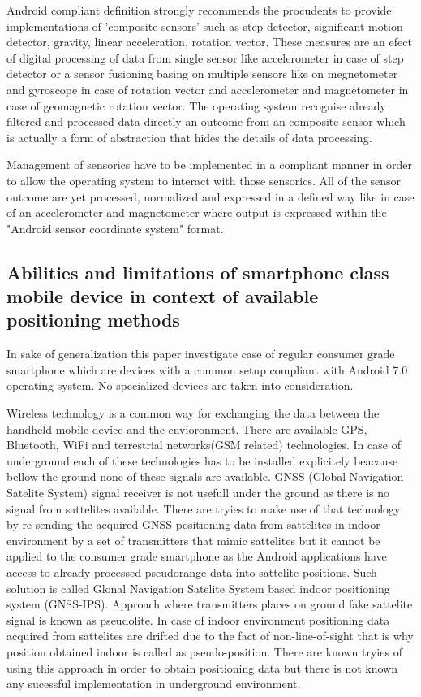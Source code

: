 \documentclass[../main.tex]{subfiles}
\begin{document}
Android compliant definition strongly recommends the procudents to provide implementations of 'composite sensors' such as step detector, significant motion detector, gravity, linear acceleration, rotation vector. These measures are an efect of digital processing of data from single sensor like accelerometer in case of step detector or a sensor fusioning basing on multiple sensors like on megnetometer and gyroscope in case of rotation vector and accelerometer and magnetometer in case of geomagnetic rotation vector. The operating system recognise already filtered and processed data directly an outcome from an composite sensor which is actually a form of abstraction that hides the details of data processing.

Management of sensorics have to be implemented in a compliant manner in order to allow the operating system to interact with those sensorics. All of the sensor outcome are yet processed, normalized and expressed in a defined way like in case of an accelerometer and magnetometer where output is expressed within the "Android sensor coordinate system" format.


\subsection{Abilities and limitations of smartphone class mobile device in context of available positioning methods}
\label{subs:smartphone_abilities_and_limitations}

In sake of generalization this paper investigate case of regular consumer grade smartphone which are devices with a common setup compliant with Android 7.0 operating system. No specialized devices are taken into consideration.

Wireless technology is a common way for exchanging the data between the handheld mobile device and the envioronment. There are available GPS, Bluetooth, WiFi and terrestrial networks(GSM related) technologies. In case of underground each of these technologies has to be installed explicitely beacause bellow the ground none of these signals are available. GNSS (Global Navigation Satelite System) signal receiver is not usefull under the ground as there is no signal from sattelites available. There are tryies to make use of that technology by re-sending the acquired GNSS positioning data from sattelites in indoor environment by a set of transmitters that mimic sattelites \cite{GPS_retransmission} but it cannot be applied to the consumer grade smartphone as the Android applications have access to already processed pseudorange data into sattelite positions. Such solution is called Glonal Navigation Satelite System based indoor positioning system (GNSS-IPS)\cite{GPS_retransmission_differential}. Approach where transmitters places on ground fake sattelite signal is known as pseudolite. In case of indoor environment positioning data acquired from sattelites are drifted due to the fact of non-line-of-sight that is why position obtained indoor is called as pseudo-position. There are known tryies of using this approach in order to obtain positioning data but there is not known any sucessful implementation in underground environment.
\end{document}
